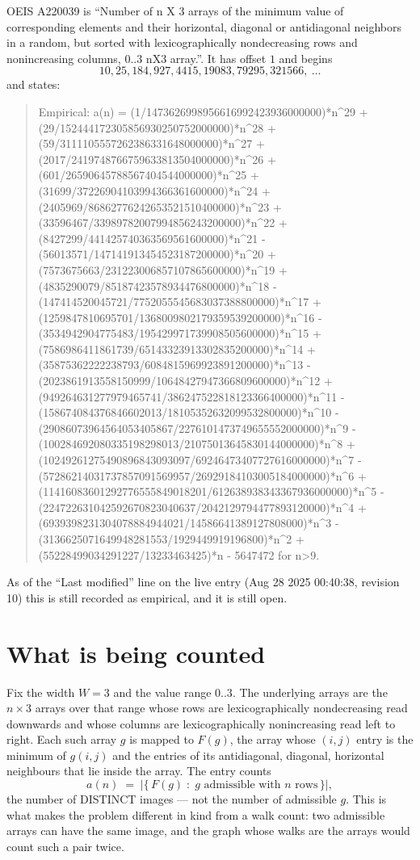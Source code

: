 \documentclass[11pt,a4paper]{article}
\theoremstyle{plain}
\theoremstyle{definition}
\begin{document}
OEIS A220039 is ``Number of n X 3 arrays of the minimum value of corresponding elements and their horizontal, diagonal or antidiagonal neighbors in a random, but sorted with lexicographically nondecreasing rows and nonincreasing columns, 0..3 nX3 array.''. It has offset $1$ and begins
\[
10, 25, 184, 927, 4415, 19083, 79295, 321566,\ \dots
\]
and states:
\begin{quote}
Empirical: a(n) = (1/1473626998956616992423936000000)*n\^{}29 + (29/152444172305856930250752000000)*n\^{}28 + (59/3111105557262386331648000000)*n\^{}27 + (2017/2419748766759633813504000000)*n\^{}26 + (601/26590645788567404544000000)*n\^{}25 + (31699/37226904103994366361600000)*n\^{}24 + (2405969/86862776242653521510400000)*n\^{}23 + (33596467/33989782007994856243200000)*n\^{}22 + (8427299/441425740363569561600000)*n\^{}21 - (56013571/147141913454523187200000)*n\^{}20 + (7573675663/231223006857107865600000)*n\^{}19 + (4835290079/85187423578934476800000)*n\^{}18 - (147414520045721/7752055545683037388800000)*n\^{}17 + (1259847810695701/1368009802179359539200000)*n\^{}16 - (3534942904775483/195429971739908505600000)*n\^{}15 + (7586986411861739/65143323913302835200000)*n\^{}14 + (35875362222238793/6084815969923891200000)*n\^{}13 - (2023861913558150999/10648427947366809600000)*n\^{}12 + (949264631277979465741/386247522818123366400000)*n\^{}11 - (158674084376846602013/18105352632099532800000)*n\^{}10 - (29086073964564053405867/2276101473749655552000000)*n\^{}9 - (100284692080335198298013/21075013645830144000000)*n\^{}8 + (10249261275490896843093097/69246473407727616000000)*n\^{}7 - (57286214031737857091569957/26929184103005184000000)*n\^{}6 + (11416083601292776555849018201/612638938343367936000000)*n\^{}5 - (224722631042592670823040637/2042129794477893120000)*n\^{}4 + (6939398231304078884944021/14586641389127808000)*n\^{}3 - (3136625071649948281553/1929449919196800)*n\^{}2 + (55228499034291227/13233463425)*n - 5647472 for n>9.
\end{quote}
As of the ``Last modified'' line on the live entry (Aug 28 2025 00:40:38, revision 10)
this is still recorded as empirical, and it is still open.

\section{What is being counted}

Fix the width $W=3$ and the value range $0..3$. The underlying arrays are the
$n\times3$ arrays over that range whose rows are lexicographically nondecreasing read downwards
and whose columns are lexicographically nonincreasing read left to right. Each such array $g$
is mapped to $F(g)$, the array whose $(i,j)$ entry is the minimum of $g(i,j)$ and the entries
of its antidiagonal, diagonal, horizontal neighbours that lie inside the array. The entry counts
\[
a(n)\;=\;\bigl|\{\,F(g)\;:\;g\text{ admissible with }n\text{ rows}\,\}\bigr|,
\]
the number of DISTINCT images --- not the number of admissible $g$. This is what makes the
problem different in kind from a walk count: two admissible arrays can have the same image, and
the graph whose walks are the arrays would count such a pair twice.
\end{document}
